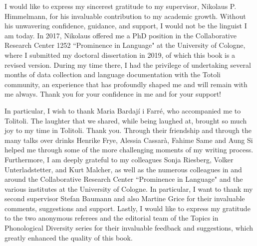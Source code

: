 I would like to express my sincerest gratitude to my supervisor, Nikolaus P. Himmelmann, for his invaluable contribution to my academic growth. Without his unwavering confidence, guidance, and support, I would not be the linguist I am today. In 2017, Nikolaus offered me a PhD position in the Collaborative Research Center 1252 ``Prominence in Language" at the University of Cologne, where I submitted my doctoral dissertation in 2019, of which this book is a revised version. During my time there, I had the privilege of undertaking several months of data collection and language documentation with the Totoli community, an experience that has profoundly shaped me and will remain with me always. Thank you for your confidence in me and for your support!

In particular, I wish to thank Maria Bardají i Farré, who accompanied me  to Tolitoli. The laughter that we shared, while being laughed at, brought so much joy to my time in Tolitoli. Thank you.
Through their friendship and through the many talks over drinks Henrike Frye, Alessia Cassarà, Fahime Same and Aung Si helped me through some of the more challenging moments of my writing process. Furthermore, I am deeply grateful to my colleagues Sonja Riesberg, Volker Unterladstetter, and Kurt Malcher, as well as the numerous colleagues in and around the Collaborative Research Center ``Prominence in Language" and the various institutes at the University of Cologne. In particular, I want to thank my second supervisor Stefan Baumann and also Martine Grice for their invaluable comments, suggestions and support. 
Lastly, I would like to express my gratitude to the two anonymous referees and the editorial team of the Topics in Phonological Diversity series for their invaluable feedback and suggestions, which greatly enhanced the quality of this book. 